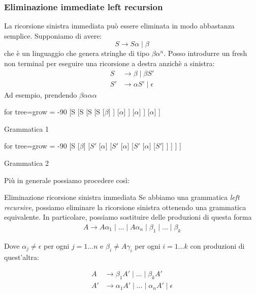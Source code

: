 \subsubsection{Eliminazione immediate left recursion}\label{eliminazione left recursion}
La ricorsione sinistra immediata può essere eliminata in modo abbastanza semplice. Supponiamo di avere:
\[
	S \rightarrow S \alpha  \mid \beta
\]
che è un linguaggio che genera stringhe di tipo $ \beta \alpha^{n}  $. Posso introdurre un fresh non terminal per eseguire una ricorsione a destra anzichè a sinistra:
\begin{align*}
	S  & \rightarrow \beta  \mid \beta S'    \\
	S' & \rightarrow \alpha S' \mid \epsilon
\end{align*}
Ad esempio, prendendo $ \beta \alpha \alpha \alpha  $
\vskip3mm
\begin{minipage}[t]{0.48\textwidth}
	\begin{center}
		\begin{forest}
			for tree={grow = -90}
			[S
				[S
						[S
								[S
										[$ \beta $]
								]
								[$ \alpha $]
						]
						[$ \alpha $]
				]
				[$ \alpha $]
			]
		\end{forest}
		\vskip3mm
		Grammatica 1
	\end{center}
\end{minipage}
%
\begin{minipage}[t]{0.48\textwidth}
	\begin{center}
		\begin{forest}
			for tree={grow = -90}
			[S
				[$ \beta $]
				[$ S' $
					[$ \alpha  $]
						[$ S' $
							[$ \alpha  $]
								[$ S' $
									[$ \alpha  $]
										[$ S' $]
								]
						]
				]
			]
		\end{forest}
		\vskip3mm
		Grammatica 2
	\end{center}
\end{minipage}
\vskip3mm
Più in generale possiamo procedere così:
\begin{teorema}{Eliminazione ricorsione sinistra immediata}
	Se abbiamo una grammatica \textit{left recursive}, possiamo eliminare la ricorsione sinistra ottenendo una grammatica equivalente. In particolare, possiamo sostituire delle produzioni di questa forma
	\begin{align*}
		A \rightarrow A\alpha_1 \mid \ldots \mid A\alpha_n \mid \beta_1 \mid \ldots \mid \beta_k
	\end{align*}

	Dove $\alpha_j \neq \epsilon$ per ogni $j = 1 \ldots n$ e $\beta_i \neq A\gamma_i$ per ogni $i = 1 \ldots k$
	\vskip3mm
	con produzioni di quest'altra:

	\begin{align*}
		A  & \rightarrow \beta_1A' \mid \ldots \mid \beta_kA'                 \\
		A' & \rightarrow \alpha_1A' \mid \ldots \mid \alpha_nA' \mid \epsilon
	\end{align*}
\end{teorema}
